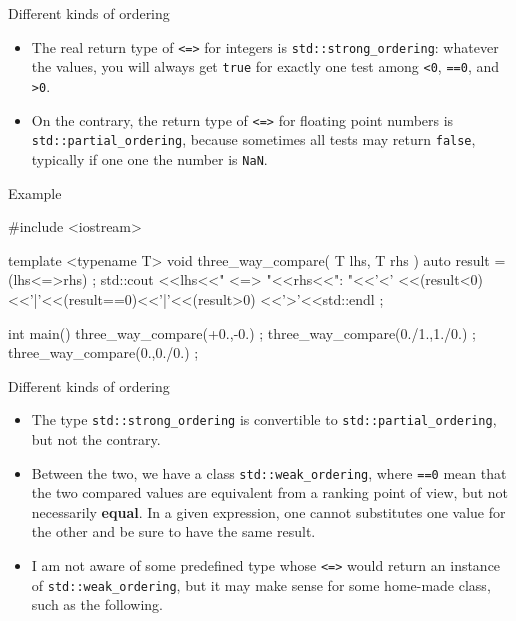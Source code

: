 \begin{frame}[fragile]
  \begin{block}{Different kinds of ordering}
    \begin{itemize}
    \item The real return type of \texttt{<=>} for integers is \texttt{std::strong_ordering}: whatever the values, you will always get \texttt{true} for exactly one test among \texttt{<0}, \texttt{==0}, and \texttt{>0}.
    \item On the contrary, the return type of \texttt{<=>} for floating point numbers is \texttt{std::partial_ordering}, because sometimes all tests may return \texttt{false}, typically if one one the number is \texttt{NaN}.
    \end{itemize}
  \end{block}
  \begin{exampleblock}{Example}
    \begin{cppcode*}{}
    #include <iostream>

    template <typename T>
    void three_way_compare( T lhs, T rhs )
     {
      auto result = (lhs<=>rhs) ;
      std::cout
        <<lhs<<" <=> "<<rhs<<": "<<'<'
        <<(result<0)<<'|'<<(result==0)<<'|'<<(result>0)
        <<'>'<<std::endl ;
     }

    int main()
     {
      three_way_compare(+0.,-0.) ;
      three_way_compare(0./1.,1./0.) ;
      three_way_compare(0.,0./0.) ;
     }
    \end{cppcode*}
  \end{exampleblock}
\end{frame}

\begin{frame}[fragile]
  \begin{block}{Different kinds of ordering}
    \begin{itemize}
      \item The type \texttt{std::strong_ordering} is convertible to \texttt{std::partial_ordering}, but not the contrary.
      \item Between the two, we have a class \texttt{std::weak_ordering}, where \texttt{==0} mean that the two compared values are equivalent from a ranking point of view, but not necessarily \textbf{equal}. In a given expression, one cannot substitutes one value for the other and be sure to have the same result.
      \item I am not aware of some predefined type whose \texttt{<=>} would return an instance of \texttt{std::weak_ordering}, but it may make sense for some home-made class, such as the following.
    \end{itemize}
  \end{block}
\end{frame}

